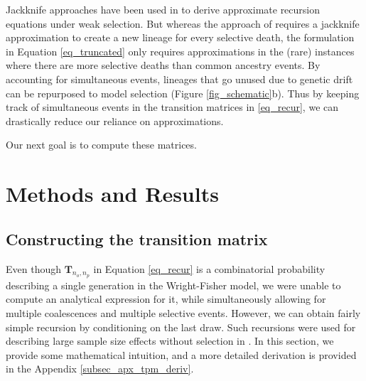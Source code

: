 \documentclass[9pt,twocolumn,twoside,lineno]{gsajnl}
\begin{document}
Jackknife approaches have been used in \cite{JouganousEtAl2017} to derive approximate 
recursion equations under weak selection. But whereas the approach of \cite{JouganousEtAl2017} 
requires a jackknife approximation to create a new lineage for every selective death, the formulation in Equation \eqref{eq_truncated}
only requires approximations in the (rare) instances where there are more selective deaths than 
common ancestry events. By accounting for simultaneous events, lineages that go unused due to genetic drift can be repurposed to model selection (Figure \ref{fig_schematic}b).
Thus by keeping track of simultaneous events in the transition matrices
in \eqref{eq_recur}, we can drastically reduce our reliance on approximations.

Our next goal is to compute these matrices.

\section{Methods and Results}
\label{sec_methods}

\subsection{Constructing the transition matrix}
\label{subsec_trans_mat}

Even though $\mathbf{T}_{n_o,n_p}$ in Equation \ref{eq_recur} is a combinatorial probability
describing a single generation in the Wright-Fisher model, we were unable to compute an analytical
expression for it, while simultaneously allowing for multiple coalescences and multiple selective events.
However,
we can obtain fairly simple recursion by conditioning on the last draw. Such recursions were used for
describing large sample size effects without selection in \citep{BhaskarEtAl2014}. In this section,
we provide some mathematical intuition, and a more detailed derivation is provided in the
Appendix \ref{subsec_apx_tpm_deriv}.
\end{document}
